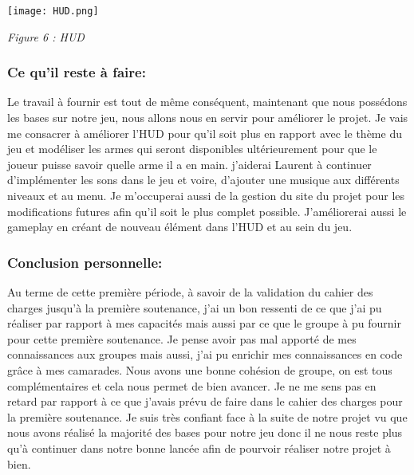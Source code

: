 \documentclass[a4paper]{article}
\begin{document}
\newpage 

\begin{center}

\texttt{[image: HUD.png]}

\quad

\textit {Figure 6 : HUD}

\end{center}


\quad

		\subsubsection{Ce qu'il reste à faire:}

\quad

Le travail à fournir est tout de même conséquent, maintenant que nous possédons les bases sur notre jeu, nous allons nous en servir pour améliorer le projet.
Je vais me consacrer à améliorer l’HUD pour qu’il soit plus en rapport avec le thème du jeu et modéliser les armes qui seront disponibles ultérieurement pour que le joueur puisse savoir quelle arme il a en main. j’aiderai Laurent à continuer d’implémenter les sons dans le jeu et voire, d’ajouter une musique aux différents niveaux et au menu.
Je m’occuperai aussi de la gestion du site du projet pour les modifications futures afin qu’il soit le plus complet possible.
J’améliorerai aussi le gameplay en créant de nouveau élément dans l’HUD et au sein du jeu.

\quad
\newpage

		\subsubsection{Conclusion personnelle:}


\quad

Au terme de cette première période, à savoir de la validation du cahier des charges jusqu'à la première soutenance, j'ai un bon ressenti de ce que j'ai pu réaliser par rapport à mes capacités mais aussi par ce que le groupe à pu fournir pour cette première soutenance.
Je pense avoir pas mal apporté de mes connaissances aux groupes mais aussi, j'ai pu enrichir mes connaissances en code grâce à mes camarades.
Nous avons une bonne cohésion de groupe, on est tous complémentaires et cela nous permet de bien avancer.
Je ne me sens pas en retard par rapport à ce que j’avais prévu de faire dans le cahier des charges pour la première soutenance.
Je suis très confiant face à la suite de notre projet vu que nous avons réalisé la majorité des bases pour notre jeu donc il ne nous reste plus qu’à continuer dans notre bonne lancée afin de pourvoir réaliser notre projet à bien.
\end{document}
